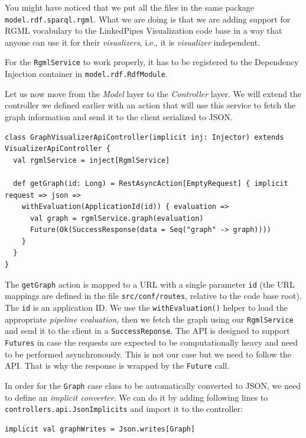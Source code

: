 You might have noticed that we put all the files in the same package \texttt{model.rdf.sparql.rgml}. What we are doing is that we are adding support for RGML vocabulary to the LinkedPipes Visualization code base in a way that anyone can use it for their \emph{visualizers}, i.e., it is \emph{visualizer} independent.

For the \texttt{RgmlService} to work properly, it has to be registered to the Dependency Injection container in \texttt{model.rdf.RdfModule}.

Let us now move from the \emph{Model} layer to the \emph{Controller} layer. We will extend the controller we defined earlier with an action that will use this service to fetch the graph information and send it to the client serialized to JSON.

\begin{verbatim}
class GraphVisualizerApiController(implicit inj: Injector) extends VisualizerApiController {
  val rgmlService = inject[RgmlService]

  def getGraph(id: Long) = RestAsyncAction[EmptyRequest] { implicit request => json =>
    withEvaluation(ApplicationId(id)) { evaluation =>
      val graph = rgmlService.graph(evaluation)
      Future(Ok(SuccessResponse(data = Seq("graph" -> graph))))
    }
  }
}
\end{verbatim}

The \texttt{getGraph} action is mapped to a URL with a single parameter \texttt{id} (the URL mappings are defined in the file \texttt{src/conf/routes}, relative to the code base root). The \texttt{id} is an application ID. We use the \texttt{withEvaluation()} helper to load the appropriate \emph{pipeline evaluation}, then we fetch the graph using our \texttt{RgmlService} and send it to the client in a \texttt{SuccessReponse}. The API is designed to support \texttt{Futures} in case the requests are expected to be computationally heavy and need to be performed asynchronously. This is not our case but we need to follow the API. That is why the response is wrapped by the \texttt{Future} call.

In order for the \texttt{Graph} case class to be automatically converted to JSON, we need to define an \emph{implicit converter}. We can do it by adding following lines to \texttt{controllers.api.JsonImplicits} and import it to the controller:

\begin{verbatim}
implicit val graphWrites = Json.writes[Graph]
\end{verbatim}

